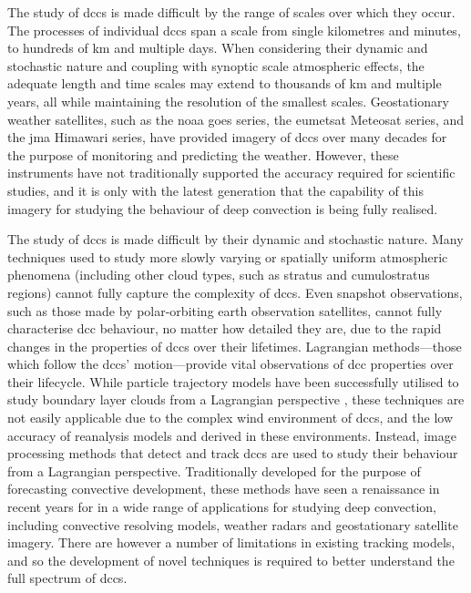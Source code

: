 The study of \acrshort{dcc}s is made difficult by the range of scales over which they occur.
The processes of individual \acrshort{dcc}s span a scale from single kilometres and minutes, to hundreds of km and multiple days.
When considering their dynamic and stochastic nature and coupling with synoptic scale atmospheric effects, the adequate length and time scales may extend to thousands of km and multiple years, all while maintaining the resolution of the smallest scales.
Geostationary weather satellites, such as the \acrfull{noaa} \acrfull{goes} series, the \acrfull{eumetsat} Meteosat series, and the \acrlong{jma} Himawari series, have provided imagery of \acrshort{dcc}s over many decades for the purpose of monitoring and predicting the weather.
However, these instruments have not traditionally supported the accuracy required for scientific studies, and it is only with the latest generation that the capability of this imagery for studying the behaviour of deep convection is being fully realised.

The study of \acrshort{dcc}s is made difficult by their dynamic and stochastic nature.
Many techniques used to study more slowly varying or spatially uniform atmospheric phenomena (including other cloud types, such as stratus and cumulostratus regions) cannot fully capture the complexity of \acrshort{dcc}s.
Even snapshot observations, such as those made by polar-orbiting earth observation satellites, cannot fully characterise \acrshort{dcc} behaviour, no matter how detailed they are, due to the rapid changes in the properties of \acrshort{dcc}s over their lifetimes.
Lagrangian methods---those which follow the \acrshort{dcc}s' motion---provide vital observations of \acrshort{dcc} properties over their lifecycle.
While particle trajectory models have been successfully utilised to study boundary layer clouds from a Lagrangian perspective \citep[e.g][]{eastman_competing_2018, christensen_aerosols_2020a}, these techniques are not easily applicable due to the complex wind environment of \acrshort{dcc}s, and the low accuracy of reanalysis models and derived  in these environments.
Instead, image processing methods that detect and track \acrshort{dcc}s are used to study their behaviour from a Lagrangian perspective.
Traditionally developed for the purpose of forecasting convective development, these methods have seen a renaissance in recent years for in a wide range of applications for studying deep convection, including convective resolving models, weather radars and geostationary satellite imagery.
There are however a number of limitations in existing tracking models, and so the development of novel techniques is required to better understand the full spectrum of \acrshort{dcc}s.

